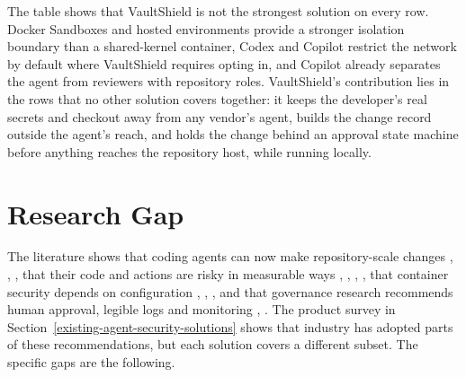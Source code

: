 \documentclass[12pt,a4paper,oneside]{report}
\begin{document}
The table shows that VaultShield is not the strongest solution on every row. Docker Sandboxes and hosted environments provide a stronger isolation boundary than a shared-kernel container, Codex and Copilot restrict the network by default where VaultShield requires opting in, and Copilot already separates the agent from reviewers with repository roles. VaultShield's contribution lies in the rows that no other solution covers together: it keeps the developer's real secrets and checkout away from any vendor's agent, builds the change record outside the agent's reach, and holds the change behind an approval state machine before anything reaches the repository host, while running locally.

\section{Research Gap}\label{research-gap}

The literature shows that coding agents can now make repository-scale changes \cite{ref2}, \cite{ref3}, \cite{ref4}, that their code and actions are risky in measurable ways \cite{ref5}, \cite{ref6}, \cite{ref7}, \cite{ref8}, that container security depends on configuration \cite{ref11}, \cite{ref12}, \cite{ref13}, and that governance research recommends human approval, legible logs and monitoring \cite{ref9}, \cite{ref10}. The product survey in Section~\ref{existing-agent-security-solutions} shows that industry has adopted parts of these recommendations, but each solution covers a different subset. The specific gaps are the following.
\end{document}
